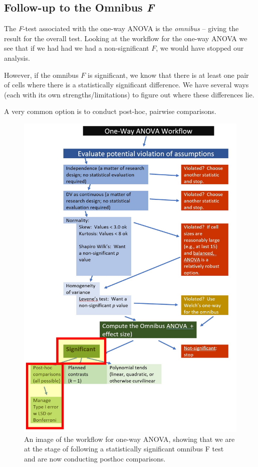 \documentclass[
  11pt,
]{book}
\begin{document}
\hypertarget{follow-up-to-the-omnibus-f}{%
\subsection{\texorpdfstring{Follow-up to the Omnibus \emph{F}}{Follow-up to the Omnibus F}}\label{follow-up-to-the-omnibus-f}}

The \emph{F}-test associated with the one-way ANOVA is the \emph{omnibus} -- giving the result for the overall test. Looking at the workflow for the one-way ANOVA we see that if we had had we had a non-significant \(F\), we would have stopped our analysis.

However, if the omnibus \(F\) is significant, we know that there is at least one pair of cells where there is a statistically significant difference. We have several ways (each with its own strengths/limitations) to figure out where these differences lie.

A very common option is to conduct post-hoc, pairwise comparisons.

\begin{figure}
\centering
\includegraphics{images/oneway/OnewayWrkFlw_phoc.jpg}
\caption{An image of the workflow for one-way ANOVA, showing that we are at the stage of following a statistically significant omnibus F test and are now conducting posthoc comparisons.}
\end{figure}
\end{document}
